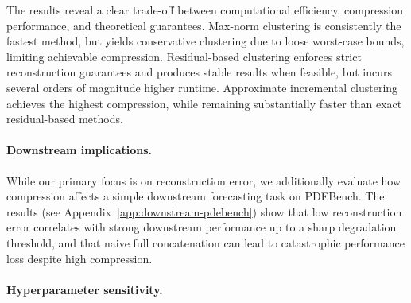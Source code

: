 \documentclass[10pt]{article} %
\begin{document}
The results reveal a clear trade-off between computational efficiency, compression performance, and theoretical guarantees.
Max-norm clustering is consistently the fastest method, but yields conservative clustering due to loose worst-case bounds, limiting achievable compression.
Residual-based clustering enforces strict reconstruction guarantees and produces stable results when feasible, but incurs several orders of magnitude higher runtime.
Approximate incremental clustering achieves the highest compression, while remaining substantially faster than exact residual-based methods.

\paragraph{Downstream implications.}
While our primary focus is on reconstruction error, we additionally evaluate how compression affects a simple downstream forecasting task on PDEBench.
The results (see Appendix~\ref{app:downstream-pdebench}) show that low reconstruction error correlates with strong downstream performance up to a sharp degradation threshold, and that naive full concatenation can lead to catastrophic performance loss despite high compression.

\paragraph{Hyperparameter sensitivity.}
\end{document}
